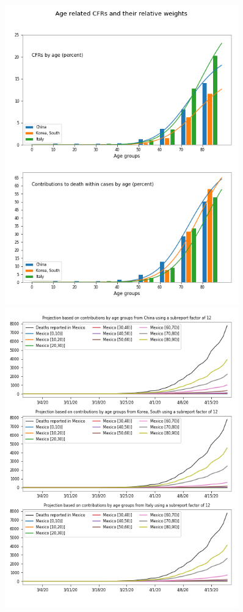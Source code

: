 \documentclass[8pt]{article}
\begin{document}
\begin{figure}[th]
\centering
\begin{minipage}{0.5\textwidth}
\includegraphics[width=0.9\textwidth]{figures/dam_COVID19_JHU_cfr+propDeathCases_ByAge_China+SKorea+Italy_OneFigure.png}
\end{minipage}%
\begin{minipage}{0.5\textwidth}
\includegraphics[width=0.9\textwidth] {figures/dam_COVID19_JHU_cfr+propDeathCasesByAgeTS_EstimatesMexico_subReportFactor12.png}

\end{minipage}
\end{figure}
\end{document}
